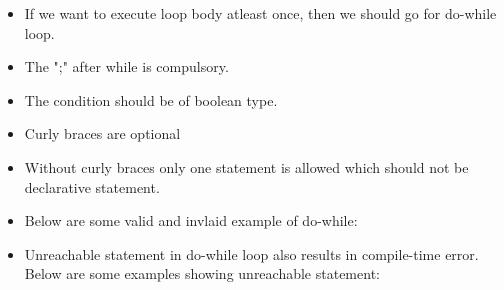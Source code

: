 \setlength{\columnsep}{3pt}
\begin{flushleft}
	
	\begin{itemize}
		\item If we want to execute loop body atleast once, then we should go for do-while loop.
		\bigskip
		\bigskip
		\item The ";" after while is compulsory.
		\item The condition should be of boolean type.
		\item Curly braces are optional
		\item Without curly braces only one statement is allowed which should not be declarative statement.
		\item Below are some valid and invlaid example of do-while:
		\bigskip
		\bigskip
		\bigskip
		\bigskip
		
		\bigskip
		\bigskip
		\item Unreachable statement in do-while loop also results in compile-time error. Below are some examples showing unreachable statement:
		\bigskip
	
		\bigskip
		\bigskip
	

\end{itemize}
\end{flushleft}
